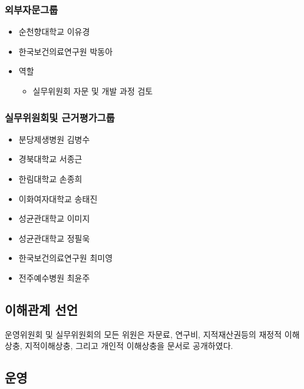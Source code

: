 \documentclass[]{book}
\providecommand{\tightlist}{%
  \setlength{\itemsep}{0pt}\setlength{\parskip}{0pt}}
\begin{document}
\hypertarget{section-32}{%
\subsubsection*{외부자문그룹}\label{section-32}}

\begin{itemize}
\item
  순천향대학교 이유경
\item
  한국보건의료연구원 박동아
\item
  역할

  \begin{itemize}
  \tightlist
  \item
    실무위원회 자문 및 개발 과정 검토
  \end{itemize}
\end{itemize}

\hypertarget{section-33}{%
\subsubsection*{실무위원회및 근거평가그룹}\label{section-33}}

\begin{itemize}
\tightlist
\item
  분당제생병원 김병수
\item
  경북대학교 서종근
\item
  한림대학교 손종희
\item
  이화여자대학교 송태진
\item
  성균관대학교 이미지
\item
  성균관대학교 정필욱
\item
  한국보건의료연구원 최미영
\item
  전주예수병원 최윤주
\end{itemize}

\hypertarget{section-34}{%
\subsection{이해관계 선언}\label{section-34}}

운영위원회 및 실무위원회의 모든 위원은 자문료, 연구비, 지적재산권등의 재정적 이해상충, 지적이해상충, 그리고 개인적 이해상충을 문서로 공개하였다.

\hypertarget{section-35}{%
\subsection{운영}\label{section-35}}
\end{document}
